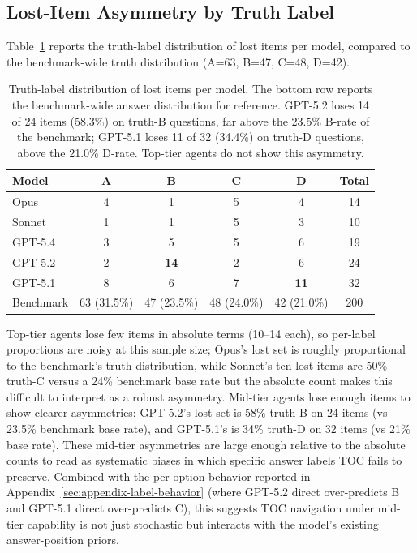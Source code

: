 \documentclass{article}
\begin{document}
\subsection{Lost-Item Asymmetry by Truth Label}

Table~\ref{tab:appendix-lost-by-label} reports the truth-label distribution of lost items per model, compared to the benchmark-wide truth distribution (A=63, B=47, C=48, D=42).

\begin{table}[h]
\centering
\small
\setlength{\tabcolsep}{8pt}
\caption{Truth-label distribution of lost items per model. The bottom row reports the benchmark-wide answer distribution for reference. GPT-5.2 loses 14 of 24 items (58.3\%) on truth-B questions, far above the 23.5\% B-rate of the benchmark; GPT-5.1 loses 11 of 32 (34.4\%) on truth-D questions, above the 21.0\% D-rate. Top-tier agents do not show this asymmetry.}
\label{tab:appendix-lost-by-label}
\begin{tabular}{lccccc}
\toprule
Model & A & B & C & D & Total \\
\midrule
Opus & 4 & 1 & 5 & 4 & 14 \\
Sonnet & 1 & 1 & 5 & 3 & 10 \\
GPT-5.4 & 3 & 5 & 5 & 6 & 19 \\
GPT-5.2 & 2 & \textbf{14} & 2 & 6 & 24 \\
GPT-5.1 & 8 & 6 & 7 & \textbf{11} & 32 \\
\midrule
Benchmark & 63 (31.5\%) & 47 (23.5\%) & 48 (24.0\%) & 42 (21.0\%) & 200 \\
\bottomrule
\end{tabular}
\end{table}

Top-tier agents lose few items in absolute terms (10--14 each), so per-label proportions are noisy at this sample size; Opus's lost set is roughly proportional to the benchmark's truth distribution, while Sonnet's ten lost items are 50\% truth-C versus a 24\% benchmark base rate but the absolute count makes this difficult to interpret as a robust asymmetry. Mid-tier agents lose enough items to show clearer asymmetries: GPT-5.2's lost set is 58\% truth-B on 24 items (vs 23.5\% benchmark base rate), and GPT-5.1's is 34\% truth-D on 32 items (vs 21\% base rate). These mid-tier asymmetries are large enough relative to the absolute counts to read as systematic biases in which specific answer labels TOC fails to preserve. Combined with the per-option behavior reported in Appendix~\ref{sec:appendix-label-behavior} (where GPT-5.2 direct over-predicts B and GPT-5.1 direct over-predicts C), this suggests TOC navigation under mid-tier capability is not just stochastic but interacts with the model's existing answer-position priors.
\end{document}

